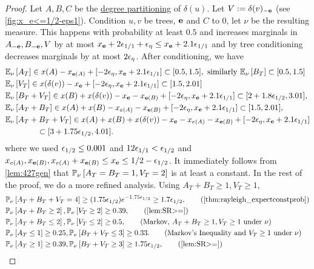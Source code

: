 \lemxesmallhalfeps*
\begin{proof}
Let $A,B,C$ be the \hyperlink{tar:degreepartition}{degree partitioning} of  $\delta(u)$.
Let $V:= \delta(v)_{-{\bf e}}$ (see \cref{fig:x_e<=1/2-eps1}).
Condition $u,v$ be trees, ${\bf e}$ and $C$ to 0, let $\nu$ be the resulting measure. This happens with probability at least  $0.5$ and increases marginals in $A_{-{\bf e}},B_{-{\bf e}}, V$ by at most $x_{\bf e}+2{\epsilon}_{1/1}+{\epsilon}_{\eta}\leq x_{\bf e}+2.1{\epsilon}_{1/1}$ and by tree conditioning decreases marginals by at most $2{\epsilon}_{\eta}$.  
After conditioning, we have
\begin{align*}
&\EE{\nu}{A_T} \in x(A)-x_{\bbe(A)}+[-2\eps_\eta, x_\bbe+2.1\eps_{1/1}] %
 \subset [0.5, 1.5], \text{ similarly }\EE{\nu}{B_T}\subset [0.5,1.5]\\
&\EE{\nu}{V_T} \in  x(\delta(v))-x_\bbe+ [-2\eps_\eta, x_\bbe+2.1\eps_{1/1}]\subset [1.5,2.01] %
\\
&\EE{\nu}{B_T+V_T} \in x(B)+x(\delta(v))-x_\bbe - x_{\bbe(B)} + [-2\eps_\eta, x_\bbe+2.1\eps_{1/1}] 
\subset [2+1.8\eps_{1/2}, 3.01],\\ %
&\EE{\nu}{A_T+B_T}\in x(A)+x(B)-x_{e(A)}-x_{\bbe(B)} + [-2\eps_\eta, x_\bbe+2.1\eps_{1/1}]\subset %
[1.5, 2.01],\\
& \EE{\nu}{A_T+B_T+V_T} \in x(A)+x(B)+x(\delta(v))-x_\bbe-x_{e(A)}-x_{\bbe(B)}+ [-2\eps_\eta, x_\bbe+2.1\eps_{1/1}] \\ 
&\quad \quad \quad \quad \subset %
[3+1.75\eps_{1/2},4.01].  %
\end{align*}
where we used ${\epsilon}_{1/2}\leq 0.001$ and $12{\epsilon}_{1/1}<{\epsilon}_{1/2}$ and $x_{e(A)},x_{{\bf e}(B)},x_{e(A)}+x_{{\bf e}(B)}\leq x_{\bf e}\leq 1/2-{\epsilon}_{1/2}$.
It immediately follows from \cref{lem:427gen} that ${\mathbb{P}}_{\nu}\left[A_T=B_T=1,V_T=2\right]$ is at least a constant. In the rest of the proof, we do a more refined analysis. 
Using $A_T+B_T\geq 1, V_T\geq 1$,
\begin{align*}
&\PP{\nu}{A_T+B_T+V_T=4}\geq 	(1.75\eps_{1/2})e^{-1.75\eps_{1/2}} \geq 1.7\eps_{1/2}, \tag{\cref{thm:rayleigh_expectconstprob}} \\
&\PP{\nu}{A_T+B_T\geq 2},\PP{\nu}{V_T\geq 2} \geq 0.39, \tag{\cref{lem:SR>=}} \\
&\PP{\nu}{A_T+B_T\leq 2},\PP{\nu}{V_T\leq 2} \geq 0.5, \tag{Markov, $A_T+B_T\geq 1, V_T\geq 1$ under $\nu$} \\
&\PP{\nu}{A_T\leq 1}\geq 0.25, \PP{\nu}{B_T+V_T\leq 3} \geq 0.33. \tag{Markov's Inequality and $V_T\geq 1$ under $\nu$}\\
&\PP{\nu}{A_T\geq 1}\geq 0.39, \PP{\nu}{B_T+V_T\geq 3}\geq 1.75\eps_{1/2}, \tag{\cref{lem:SR>=}}
\end{align*}


\end{proof}
